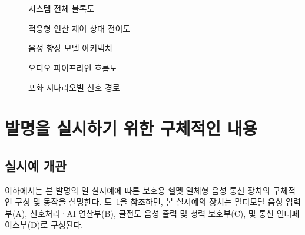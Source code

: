 \documentclass{article}
\begin{document}
\begin{figure}[H]
    \centering
    \resizebox{\textwidth}{!}{%
    }
    \caption{시스템 전체 블록도}
    \label{fig:system-block}
\end{figure}

\begin{figure}[H]
    \centering
    \resizebox{0.97\textwidth}{!}{%
    }
    \caption{적응형 연산 제어 상태 전이도}
    \label{fig:state-transition}
\end{figure}

\begin{figure}[H]
    \centering
    \resizebox{0.97\textwidth}{!}{%
    }
    \caption{음성 향상 모델 아키텍처}
    \label{fig:model-architecture}
\end{figure}

\begin{figure}[H]
    \centering
    \resizebox{0.97\textwidth}{!}{%
    }
    \caption{오디오 파이프라인 흐름도}
    \label{fig:audio-pipeline}
\end{figure}

\begin{figure}[H]
    \centering
    \resizebox{0.97\textwidth}{!}{%
    }
    \caption{포화 시나리오별 신호 경로}
    \label{fig:saturation-scenarios}
\end{figure}

\clearpage

\section{발명을 실시하기 위한 구체적인 내용}


\subsection{실시예 개관}

이하에서는 본 발명의 일 실시예에 따른 보호용 헬멧 일체형 음성 통신 장치의 구체적인 구성 및 동작을 설명한다. 도~\ref{fig:system-block}을 참조하면, 본 실시예의 장치는 멀티모달 음성 입력부(A), 신호처리·AI 연산부(B), 골전도 음성 출력 및 청력 보호부(C), 및 통신 인터페이스부(D)로 구성된다.
\end{document}
